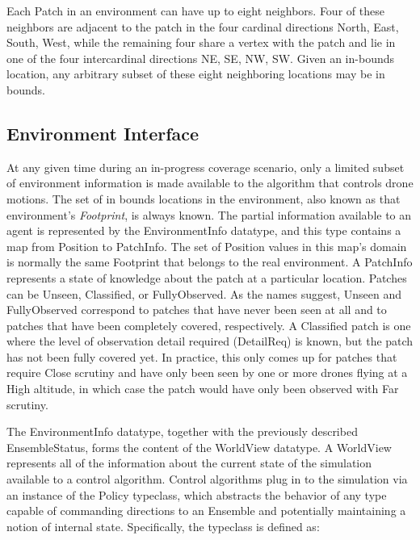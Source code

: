 
Each Patch in an environment can have up to eight neighbors. Four of these neighbors are adjacent to the patch in the four cardinal directions {North, East, South, West}, while the remaining four share a vertex with the patch and lie in one of the four intercardinal directions {NE, SE, NW, SW}. Given an in-bounds location, any arbitrary subset of these eight neighboring locations may be in bounds.


\subsection{Environment Interface}

At any given time during an in-progress coverage scenario, only a limited subset of environment information is made available to the algorithm that controls drone motions. The set of in bounds locations in the environment, also known as that environment's \textit{Footprint}, is always known. The partial information available to an agent is represented by the EnvironmentInfo datatype, and this type contains a map from Position to PatchInfo. The set of Position values in this map's domain is normally the same Footprint that belongs to the real environment. A PatchInfo represents a state of knowledge about the patch at a particular location. Patches can be Unseen, Classified, or FullyObserved. As the names suggest, Unseen and FullyObserved correspond to patches that have never been seen at all and to patches that have been completely covered, respectively. A Classified patch is one where the level of observation detail required (DetailReq) is known, but the patch has not been fully covered yet. In practice, this only comes up for patches that require Close scrutiny and have only been seen by one or more drones flying at a High altitude, in which case the patch would have only been observed with Far scrutiny.

The EnvironmentInfo datatype, together with the previously described EnsembleStatus, forms the content of the WorldView datatype. A WorldView represents all of the information about the current state of the simulation available to a control algorithm. Control algorithms plug in to the simulation via an instance of the Policy typeclass, which abstracts the behavior of any type capable of commanding directions to an Ensemble and potentially maintaining a notion of internal state. Specifically, the typeclass is defined as:

